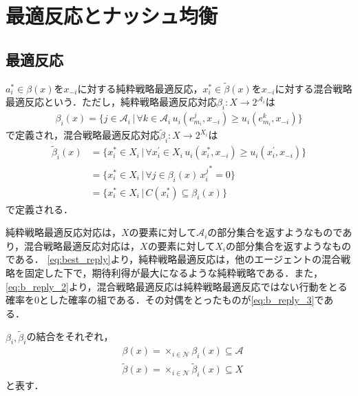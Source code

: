 \documentclass{jsreport}
\begin{document}
\section{最適反応とナッシュ均衡}
\subsection{最適反応}
\begin{screen}
  \begin{defi}[最適反応]
    $a_i^{*} \in \beta(x)$を$x_{-i}$に対する純粋戦略最適反応，$x_i^{*} \in \tilde{\beta}(x)$を$x_{-i}$に対する混合戦略最適反応という．ただし，純粋戦略最適反応対応$\beta_i: X \to 2^{\mathcal{A}_i}$は
    \begin{align}
      \beta_i(x) = \{j \in \mathcal{A}_i \, | \, \forall k \in \mathcal{A}_i \, u_i(e_{m_i}^j, x_{-i}) \geq u_i(e_{m_i}^k, x_{-i})\} \label{eq:best_reply}
    \end{align}
    で定義され，混合戦略最適反応対応$\tilde{\beta}_i: X \to 2^{X_i}$は
    \begin{align}
      \tilde{\beta}_i(x) &= \{x_i^{*} \in X_i \, | \, \forall x_i^{\prime} \in X_i \, u_i(x_i^{*}, x_{-i}) \geq u_i(x_i^{\prime}, x_{-i})\} \label{eq:b_reply_1} \\
      &= \{x_i^{*} \in X_i \, | \, \forall j \in \beta_i(x) \, {x_i^{j}}^{*} = 0\} \label{eq:b_reply_2} \\
      &= \{x_i^{*} \in X_i \, | \, C(x_i^{*}) \subseteq \beta_i(x)\} \label{eq:b_reply_3}
    \end{align}
    で定義される．
  \end{defi}
\end{screen}

純粋戦略最適反応対応は，$X$の要素に対して$\mathcal{A}_i$の部分集合を返すようなものであり，混合戦略最適反応対応は，$X$の要素に対して$X_i$の部分集合を返すようなものである．
\eqref{eq:best_reply}より，純粋戦略最適反応は，他のエージェントの混合戦略を固定した下で，期待利得が最大になるような純粋戦略である．また，\eqref{eq:b_reply_2}より，混合戦略最適反応は純粋戦略最適反応ではない行動をとる確率を0とした確率の組である．その対偶をとったものが\eqref{eq:b_reply_3}である．

$\beta_i, \tilde{\beta}_i$の結合をそれぞれ，
\begin{align}
  &\beta(x) = \times_{i \in \mathcal{N}} \beta_i(x) \subseteq \mathcal{A} \nonumber \\
  &\tilde{\beta}(x) = \times_{i \in \mathcal{N}} \tilde{\beta}_i(x) \subseteq X \nonumber
\end{align}
と表す．
\end{document}
